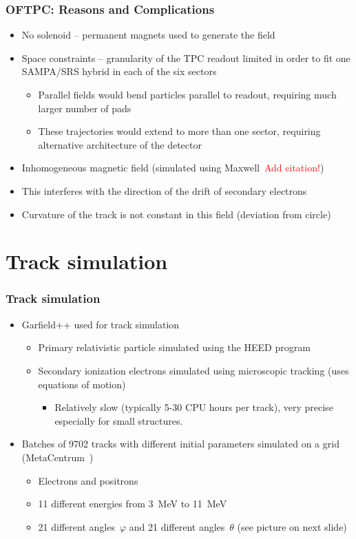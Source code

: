 \documentclass{beamer}
\begin{document}
	\begin{frame}
		\frametitle{OFTPC: Reasons and Complications}
		\begin{itemize}
			\item No solenoid -- permanent magnets used to generate the field
			\item Space constraints -- granularity of the TPC readout limited in order to fit one SAMPA/SRS hybrid in each of the six sectors
			\begin{itemize}
				\item Parallel fields would bend particles parallel to readout, requiring much larger number of pads
				\item These trajectories would extend to more than one sector, requiring alternative architecture of the detector
			\end{itemize}
			\item Inhomogeneous magnetic field (simulated using Maxwell~\textcolor{red}{Add citation!})
			\item This interferes with the direction of the drift of secondary electrons
			\item Curvature of the track is not constant in this field (deviation from circle)
		\end{itemize}
	\end{frame}
	
	\section{Track simulation}
	\begin{frame}
		\frametitle{Track simulation}
		\begin{itemize}
			\item Garfield++ used for track simulation
			\begin{itemize}
				\item Primary relativistic particle simulated using the HEED program~\cite{heed}
				\item Secondary ionization electrons simulated using microscopic tracking (uses equations of motion)
				\begin{itemize}\item Relatively slow (typically 5-30 CPU hours per track), very precise especially for small structures.  \end{itemize}
			\end{itemize}
			\item Batches of 9702 tracks with different initial parameters simulated on a grid (MetaCentrum~\cite{meta})
			\begin{itemize}
				\item Electrons and positrons
				\item 11 different energies from 3~MeV to 11~MeV
				\item 21 different angles~$\varphi$ and 21 different angles~$\theta$ (see picture on next slide)
			\end{itemize}
		\end{itemize}
	\end{frame}
	
\end{document}
